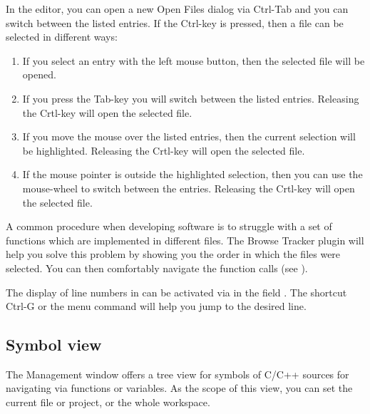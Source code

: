 

In the editor, you can open a new Open Files dialog via Ctrl-Tab and you can switch between the listed entries. If the Ctrl-key is pressed, then a file can be selected in different ways:

\begin{enumerate}
\item If you select an entry with the left mouse button, then the selected file will be opened.
\item If you press the Tab-key you will switch between the listed entries. Releasing the Crtl-key will open the selected file.
\item If you move the mouse over the listed entries, then the current selection will be highlighted. Releasing the Crtl-key will open the selected file.
\item If the mouse pointer is  outside the highlighted selection, then you can use the mouse-wheel to switch between the entries. Releasing the Crtl-key will open the selected file.
\end{enumerate}

A common procedure when developing software is to struggle with a set of functions which are implemented in different files. The Browse Tracker plugin will help you solve this problem by showing you the order in which the files were selected. You can then comfortably navigate the function calls (see ).

The display of line numbers in \codeblocks can be activated via  in the field . The shortcut Ctrl-G or the menu command  will help you jump to the desired line.


\subsection{Symbol view}

The \codeblocks Management window offers a tree view for symbols of C/C++ sources for navigating via functions or variables. As the scope of this view, you can set the current file or project, or the whole workspace.

